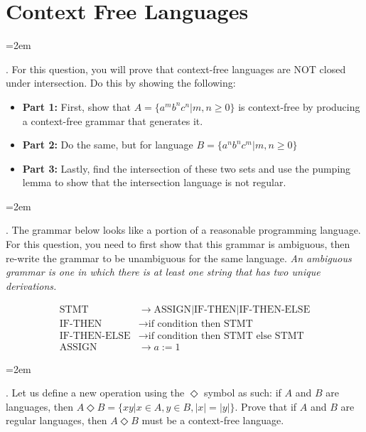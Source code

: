 \documentclass[12pt]{article}
\def\homework{Context Free Languages}
\newcounter{quesnum}
\newcommand{\question}[2][??]{
\begin{list}{\labelitemi}{\leftmargin=2em}
\item [\arabic{quesnum}.] {} {#2}
\end{list}
\addtocounter{quesnum}{1}
}
\begin{document}
\section*{\homework}


\question[3]{
For this question, you will prove that context-free languages are NOT closed under intersection. Do this by showing the following:
}

\begin{itemize}
	\item \textbf{Part 1:} First, show that $A=\{a^mb^nc^n | m,n \geq 0\}$ is context-free by producing a context-free grammar that generates it.
	\item \textbf{Part 2:} Do the same, but for language $B=\{a^nb^nc^m | m,n \geq 0\}$
	\item \textbf{Part 3:} Lastly, find the intersection of these two sets and use the pumping lemma to show that the intersection language is not regular.
\end{itemize}

\vspace{12pt}


\question[3]{
The grammar below looks like a portion of a reasonable programming language. For this question, you need to first show that this grammar is ambiguous, then re-write the grammar to be unambiguous for the same language. \emph{An ambiguous grammar is one in which there is at least one string that has two unique derivations.}
}


\begin{align*} 
\text{STMT} &\rightarrow \text{ASSIGN} | \text{IF-THEN} | \text{IF-THEN-ELSE} \\
\text{IF-THEN} &\rightarrow \text{if condition then STMT} \\
\text{IF-THEN-ELSE} &\rightarrow \text{if condition then STMT else STMT} \\
\text{ASSIGN} &\rightarrow a:=1
\end{align*}

\vspace{12pt}


\question[3]{
Let us define a new operation using the $\Diamond$ symbol as such: if $A$ and $B$ are languages, then $A \Diamond B = \{xy | x \in A, y \in B, |x|=|y| \}$. Prove that if $A$ and $B$ are regular languages, then $A \Diamond B$ must be a context-free language.
}
\end{document}
